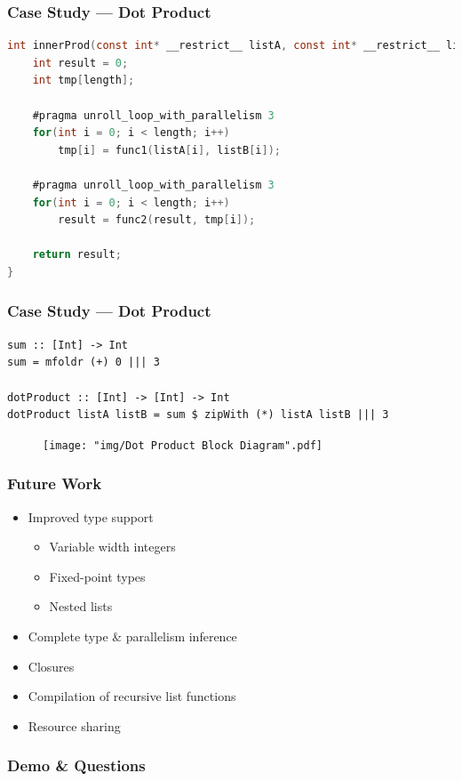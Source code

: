 \documentclass{beamer}
\begin{document}
\begin{frame}[fragile]
    \frametitle{Case Study --- Dot Product}

\begin{lstlisting}[language=C]
int innerProd(const int* __restrict__ listA, const int* __restrict__ listB, int length){
    int result = 0;
    int tmp[length];

    #pragma unroll_loop_with_parallelism 3
    for(int i = 0; i < length; i++)
        tmp[i] = func1(listA[i], listB[i]);

    #pragma unroll_loop_with_parallelism 3
    for(int i = 0; i < length; i++)
        result = func2(result, tmp[i]);

    return result;
}
\end{lstlisting}
\end{frame}

\begin{frame}[fragile]
    \frametitle{Case Study --- Dot Product}

\begin{lstlisting}
sum :: [Int] -> Int
sum = mfoldr (+) 0 ||| 3

dotProduct :: [Int] -> [Int] -> Int
dotProduct listA listB = sum $ zipWith (*) listA listB ||| 3
\end{lstlisting}

\pause
\begin{figure}
    \texttt{[image: "img/Dot Product Block Diagram".pdf]}
\end{figure}
\end{frame}


\begin{frame}
    \frametitle{Future Work}
    \begin{itemize}
        \item Improved type support
            \begin{itemize}
                    \item Variable width integers
                    \item Fixed-point types
                    \item Nested lists
            \end{itemize}

        \item Complete type \& parallelism inference
        \item Closures
        \item Compilation of recursive list functions
        \item Resource sharing
    \end{itemize}
\end{frame}


\begin{frame}
    \frametitle{Demo \& Questions}
\end{frame}
\end{document}
